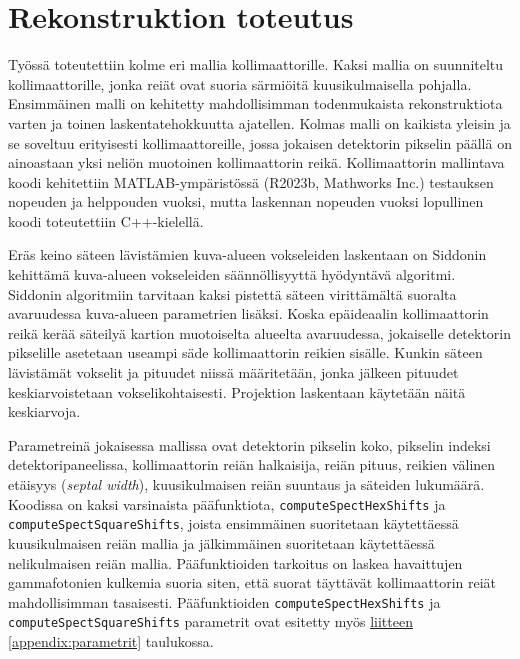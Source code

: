 \section{Rekonstruktion toteutus}
Työssä toteutettiin kolme eri mallia kollimaattorille. Kaksi mallia on suunniteltu kollimaattorille, jonka reiät ovat suoria särmiöitä kuusikulmaisella pohjalla. Ensimmäinen malli on kehitetty mahdollisimman todenmukaista rekonstruktiota varten ja toinen laskentatehokkuutta ajatellen. Kolmas malli on kaikista yleisin ja se soveltuu erityisesti kollimaattoreille, jossa jokaisen detektorin pikselin päällä on ainoastaan yksi neliön muotoinen kollimaattorin reikä. Kollimaattorin mallintava koodi kehitettiin MATLAB-ympäristössä (R2023b, Mathworks Inc.) testauksen nopeuden ja helppouden vuoksi, mutta laskennan nopeuden vuoksi lopullinen koodi toteutettiin C++-kielellä.

Eräs keino säteen lävistämien kuva-alueen vokseleiden laskentaan on Siddonin kehittämä kuva-alueen vokseleiden säännöllisyyttä hyödyntävä algoritmi\cite{siddon_fast_1985, sundermann_fast_1998}. Siddonin algoritmiin tarvitaan kaksi pistettä säteen virittämältä suoralta avaruudessa kuva-alueen parametrien lisäksi\cite{sundermann_fast_1998}. Koska epäideaalin kollimaattorin reikä kerää säteilyä kartion muotoiselta alueelta avaruudessa\cite{cherry_single_2012}, jokaiselle detektorin pikselille asetetaan useampi säde kollimaattorin reikien sisälle. Kunkin säteen lävistämät vokselit ja pituudet niissä määritetään, jonka jälkeen pituudet keskiarvoistetaan vokselikohtaisesti. Projektion laskentaan käytetään näitä keskiarvoja.

Parametreinä jokaisessa mallissa ovat detektorin pikselin koko, pikselin indeksi detektoripaneelissa, kollimaattorin reiän halkaisija, reiän pituus, reikien välinen etäisyys (\textit{septal width}), kuusikulmaisen reiän suuntaus ja säteiden lukumäärä. Koodissa on kaksi varsinaista pääfunktiota, \texttt{computeSpectHexShifts} ja \texttt{computeSpectSquareShifts}, joista ensimmäinen suoritetaan käytettäessä kuusikulmaisen reiän mallia ja jälkimmäinen suoritetaan käytettäessä nelikulmaisen reiän mallia. Pääfunktioiden tarkoitus on laskea havaittujen gammafotonien kulkemia suoria siten, että suorat täyttävät kollimaattorin reiät mahdollisimman tasaisesti. Pääfunktioiden \texttt{computeSpectHexShifts} ja \texttt{computeSpectSquareShifts} parametrit ovat esitetty myös \hyperref[appendix:parametrit]{liitteen \ref*{appendix:parametrit}} taulukossa.

